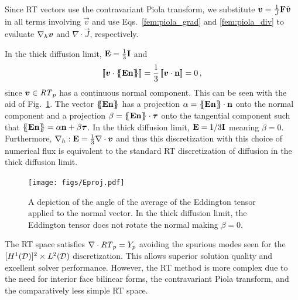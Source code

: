\documentclass[../doc.tex]{subfiles}
\begin{document}
Since RT vectors use the contravariant Piola transform, we substitute $\boldsymbol{v} = \frac{1}{J}\boldsymbol{\mathrm{F}}\hat{\boldsymbol{v}}$ in all terms involving $\vec{v}$ and use Eqs.~\ref{fem:piola_grad} and \ref{fem:piola_div} to evaluate $\nabla_h\boldsymbol{v}$ and $\nabla\cdot\vec{J}$, respectively. 

In the thick diffusion limit, $\boldsymbol{\mathrm{E}} = \frac{1}{3}\boldsymbol{\mathrm{I}}$ and 
	\begin{equation}
		\left\llbracket\boldsymbol{v}\cdot\left\{\!\!\left\{\boldsymbol{\mathrm{E}}\boldsymbol{\mathrm{n}}\right\}\!\!\right\} \right\rrbracket = \frac{1}{3}\left\llbracket\boldsymbol{v}\cdot\boldsymbol{\mathrm{n}} \right\rrbracket = 0 \,, 
	\end{equation}
since $\boldsymbol{v} \in \mathit{RT}_p$ has a continuous normal component. This can be seen with the aid of Fig.~\ref{rtvef:Eproj}. The vector $\left\{\!\!\left\{\boldsymbol{\mathrm{E}}\boldsymbol{\mathrm{n}}\right\}\!\!\right\}$ has a projection $\alpha = \left\{\!\!\left\{\boldsymbol{\mathrm{E}}\boldsymbol{\mathrm{n}}\right\}\!\!\right\}\cdot\boldsymbol{\mathrm{n}}$ onto the normal component and a projection $\beta = \left\{\!\!\left\{\boldsymbol{\mathrm{E}}\boldsymbol{\mathrm{n}}\right\}\!\!\right\}\cdot\boldsymbol{\mathrm{\tau}}$ onto the tangential component such that $\left\{\!\!\left\{\boldsymbol{\mathrm{E}}\boldsymbol{\mathrm{n}}\right\}\!\!\right\} = \alpha \boldsymbol{\mathrm{n}} + \beta \boldsymbol{\mathrm{\tau}}$. In the thick diffusion limit, $\boldsymbol{\mathrm{E}} = 1/3\boldsymbol{\mathrm{I}}$ meaning $\beta = 0$. 
Furthermore, $\nabla_h:\boldsymbol{\mathrm{E}} = \frac{1}{3}\nabla\cdot\boldsymbol{v}$ and thus this discretization with this choice of numerical flux is equivalent to the standard RT discretization of diffusion in the thick diffusion limit. 
\begin{figure}
\centering
\texttt{[image: figs/Eproj.pdf]}
\caption{A depiction of the angle of the average of the Eddington tensor applied to the normal vector. In the thick diffusion limit, the Eddington tensor does not rotate the normal making $\beta =0$. }
\label{rtvef:Eproj}
\end{figure}

The RT space satisfies $\nabla\cdot\mathit{RT}_p = Y_p$ avoiding the spurious modes seen for the $[H^1(\mathcal{D})]^2 \times L^2(\mathcal{D})$ discretization. This allows superior solution quality and excellent solver performance. However, the RT method is more complex due to the need for interior face bilinear forms, the contravariant Piola transform, and the comparatively less simple RT space. 
\end{document}
